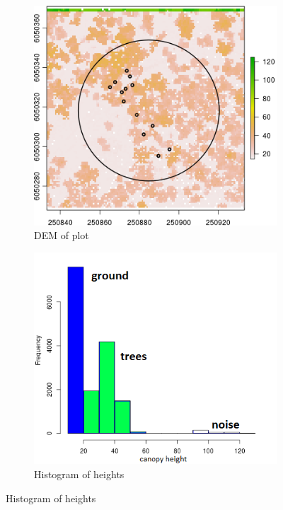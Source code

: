 \documentclass{subfiles}
\begin{document}
\begin{figure} [h!]
\begin{subfigure}[t]{.49\textwidth}
 		\centering
 		\includegraphics[width=\textwidth]{img/dead/c4_height}
 		\caption{DEM of plot}
 		\label{fig:c4_height}
 	\end{subfigure} \hfill
 	\begin{subfigure}[t]{.49\textwidth}
 		\centering
 		\includegraphics[width=\textwidth]{img/dead/c5_histHeight}
 		\caption{Histogram of heights} 
 		\label{fig:c5_heightHist}
 	\end{subfigure} \hfill

\end{figure}
\end{document}
